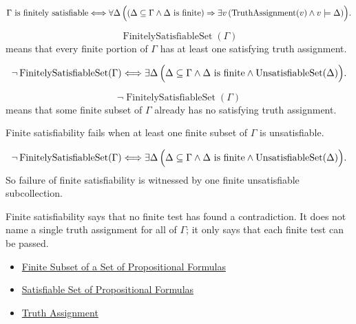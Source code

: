 \begin{remark*}
\[
\Gamma\text{ is finitely satisfiable}
\Longleftrightarrow
\forall\Delta\,\Bigl((\Delta\subseteq\Gamma\land \Delta\text{ is finite})
\Rightarrow \exists v\,(\operatorname{TruthAssignment}(v)\land v\models\Delta)\Bigr).
\]
\end{remark*}

\begin{remark*}
\[
\operatorname{FinitelySatisfiableSet}(\Gamma)
\]
means that every finite portion of \(\Gamma\) has at least one satisfying truth
assignment.
\end{remark*}

\begin{remark*}
\[
\neg\operatorname{FinitelySatisfiableSet}(\Gamma)
\Longleftrightarrow
\exists\Delta\,\Bigl(\Delta\subseteq\Gamma\land \Delta\text{ is finite}\land
\operatorname{UnsatisfiableSet}(\Delta)\Bigr).
\]
\end{remark*}

\begin{remark*}
\[
\neg\operatorname{FinitelySatisfiableSet}(\Gamma)
\]
means that some finite subset of \(\Gamma\) already has no satisfying truth
assignment.
\end{remark*}

\begin{remark*}
Finite satisfiability fails when at least one finite subset of \(\Gamma\) is
unsatisfiable.
\end{remark*}

\begin{remark*}
\[
\neg\operatorname{FinitelySatisfiableSet}(\Gamma)
\Longleftrightarrow
\exists\Delta\,\Bigl(\Delta\subseteq\Gamma\land \Delta\text{ is finite}\land
\operatorname{UnsatisfiableSet}(\Delta)\Bigr).
\]
So failure of finite satisfiability is witnessed by one finite unsatisfiable
subcollection.
\end{remark*}

\begin{remark*}[Interpretation]
Finite satisfiability says that no finite test has found a contradiction. It
does not name a single truth assignment for all of \(\Gamma\); it only says
that each finite test can be passed.
\end{remark*}

\begin{dependencies}
\begin{itemize}
  \item \hyperref[def:finite-subset-of-set-of-propositional-formulas]{Finite Subset of a Set of Propositional Formulas}
  \item \hyperref[def:satisfiable-set-of-propositional-formulas]{Satisfiable Set of Propositional Formulas}
  \item \hyperref[def:truth-assignment-propositional-logic]{Truth Assignment}
\end{itemize}
\end{dependencies}
